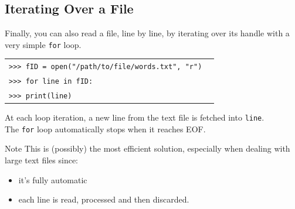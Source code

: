 \documentclass[t,handout,9pt]{beamer}
\begin{document}
\subsection{Iterating Over a File}
\begin{frame}
\vfill
Finally, you can also read a file, line by line, by iterating over its handle with a very simple \texttt{for} loop.
\begin{table}[]
\begin{flushleft}
\begin{tabular}{ll}
\texttt{>{}>{}> fID = open("/path/to/file/words.txt", "r")} &  \\
\texttt{>{}>{}> for line in fID:} &  \\
\texttt{>{}>{}> \qquad print(line)} &  \\
\end{tabular}
\end{flushleft}
\end{table}
At each loop iteration, a new line from the text file is fetched into \texttt{line}.\\
The \texttt{for} loop automatically stops when it reaches EOF.
\begin{block}{Note}
This is (possibly) the most efficient solution, especially when dealing with large text files since:
\begin{itemize}
	\item it's fully automatic
	\item each line is read, processed and then discarded.
\end{itemize}
\end{block}
\vfill
\end{frame}
%
\end{document}

